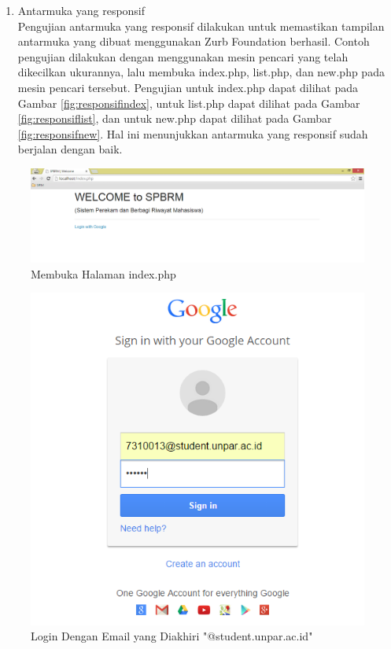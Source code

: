 \begin{enumerate}[(1)]
\item Antarmuka yang responsif\\
    Pengujian antarmuka yang responsif dilakukan untuk memastikan tampilan antarmuka yang dibuat menggunakan Zurb Foundation berhasil. Contoh pengujian dilakukan dengan menggunakan mesin pencari yang telah dikecilkan ukurannya, lalu membuka index.php, list.php, dan new.php pada mesin pencari tersebut. Pengujian untuk index.php dapat dilihat pada Gambar \ref{fig:responsifindex}, untuk list.php dapat dilihat pada Gambar \ref{fig:responsiflist}, dan untuk new.php dapat dilihat pada Gambar \ref{fig:responsifnew}. Hal ini menunjukkan antarmuka yang responsif sudah berjalan dengan baik.
\end{enumerate}

\begin{figure}[H]
\centering
\includegraphics[scale=0.44]{Gambar/pengujian1.png}
\caption[Membuka Halaman index.php]{Membuka Halaman index.php} 
\label{fig:membukahalamanindex}
\end{figure}

\begin{figure}[H]
\centering
\includegraphics[scale=0.44]{Gambar/pengujian2.png}
\caption[Login Dengan Email yang Diakhiri "@student.unpar.ac.id"]{Login Dengan
Email yang Diakhiri "@student.unpar.ac.id"}
\label{fig:logindenganstudent}
\end{figure}

